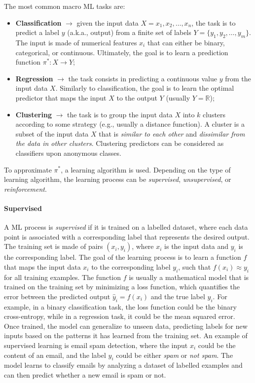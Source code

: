 The most common macro \gls{ML} tasks are:
%
\begin{itemize}
    \item \textbf{Classification} $\rightarrow$ given the input data $X={x_1, x_2, \dots, x_n}$, the task is to predict a label $y$ (a.k.a., output) from a finite set of labels $Y=\{y_1, y_2, \dots, y_m\}$.
    The input is made of numerical features $x_i$ that can either be binary, categorical, or continuous.
    Ultimately, the goal is to learn a prediction function $\pi^{*}: X \rightarrow Y$;
    \item \textbf{Regression} $\rightarrow$ the task consists in predicting a continuous value $y$ from the input data $X$.
    Similarly to classification, the goal is to learn the optimal predictor that maps the input $X$ to the output $Y$ (usually $Y=\mathbb{R}$);
    \item \textbf{Clustering} $\rightarrow$ the task is to group the input data $X$ into $k$ clusters according to some strategy (e.g., usually a distance function).
    A cluster is a subset of the input data $X$ that is \emph{similar to each other} and \emph{dissimilar from the data in other clusters}.
    Clustering predictors can be considered as classifiers upon anonymous classes.
\end{itemize}
%
To approximate $\pi^{*}$, a learning algorithm is used.
%
Depending on the type of learning algorithm, the learning process can be \emph{supervised}, \emph{unsupervised}, or \emph{reinforcement}.
%

\paragraph{Supervised}
%
A \gls{ML} process is \emph{supervised} if it is trained on a labelled dataset, where each data point is associated with a corresponding label that represents the desired output.
%
The training set is made of pairs $(x_i, y_i)$, where $x_i$ is the input data and $y_i$ is the corresponding label.
%
The goal of the learning process is to learn a function $f$ that maps the input data $x_i$ to the corresponding label $y_i$, such that $f(x_i) \approx y_i$ for all training examples.
%
The function $f$ is usually a mathematical model that is trained on the training set by minimizing a loss function, which quantifies the error between the predicted output $\hat{y}_i = f(x_i)$ and the true label $y_i$.
%
For example, in a binary classification task, the loss function could be the binary cross-entropy, while in a regression task, it could be the mean squared error.
%
Once trained, the model can generalize to unseen data, predicting labels for new inputs based on the patterns it has learned from the training set.
%
An example of supervised learning is email spam detection, where the input $x_i$ could be the content of an email, and the label $y_i$ could be either \emph{spam} or \emph{not spam}.
%
The model learns to classify emails by analyzing a dataset of labelled examples and can then predict whether a new email is spam or not.
%

